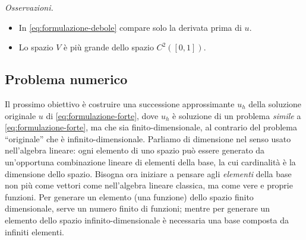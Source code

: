 \textit{Osservazioni.} %
\begin{itemize}
	\item In \eqref{eq:formulazione-debole} compare solo la derivata prima di $u$.
	\item Lo spazio $\displaystyle V$ è più grande dello spazio $\displaystyle C^{2}([ 0,1])$.
\end{itemize}
\subsection{Problema numerico}

Il prossimo obiettivo è costruire una successione approssimante $u_{h}$ della soluzione originale $u$ di \eqref{eq:formulazione-forte}, dove $u_{h}$ è soluzione di un problema \textit{simile} a \eqref{eq:formulazione-forte}, ma che sia finito-dimensionale, al contrario del problema ``originale'' che è infinito-dimensionale.
Parliamo di dimensione nel senso usato nell'algebra lineare: ogni elemento di uno spazio può essere generato da un'opportuna combinazione lineare di elementi della base, la cui cardinalità è la dimensione dello spazio.
Bisogna ora iniziare a pensare agli \textit{elementi} della base non più come vettori come nell'algebra lineare classica, ma come vere e proprie funzioni.
Per generare un elemento (una funzione) dello spazio finito dimensionale, serve un numero finito di funzioni; mentre per generare un elemento dello spazio infinito-dimensionale è necessaria una base composta da infiniti elementi.

